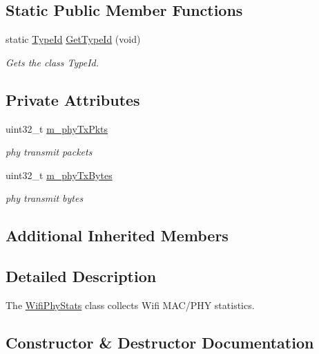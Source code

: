\subsection*{Static Public Member Functions}
\begin{DoxyCompactItemize}
\item 
static \hyperlink{classns3_1_1TypeId}{Type\+Id} \hyperlink{classWifiPhyStats_a3d26a3a02ef7219470bdfd461457cbda}{Get\+Type\+Id} (void)
\begin{DoxyCompactList}\small\item\em Gets the class Type\+Id. \end{DoxyCompactList}\end{DoxyCompactItemize}
\subsection*{Private Attributes}
\begin{DoxyCompactItemize}
\item 
uint32\+\_\+t \hyperlink{classWifiPhyStats_ac44edc1ac4d40a158f4bd44d19f8ea06}{m\+\_\+phy\+Tx\+Pkts}
\begin{DoxyCompactList}\small\item\em phy transmit packets \end{DoxyCompactList}\item 
uint32\+\_\+t \hyperlink{classWifiPhyStats_a124dc861c6c9336ea9b6924875365735}{m\+\_\+phy\+Tx\+Bytes}
\begin{DoxyCompactList}\small\item\em phy transmit bytes \end{DoxyCompactList}\end{DoxyCompactItemize}
\subsection*{Additional Inherited Members}


\subsection{Detailed Description}
The \hyperlink{classWifiPhyStats}{Wifi\+Phy\+Stats} class collects Wifi M\+A\+C/\+P\+HY statistics. 

\subsection{Constructor \& Destructor Documentation}
